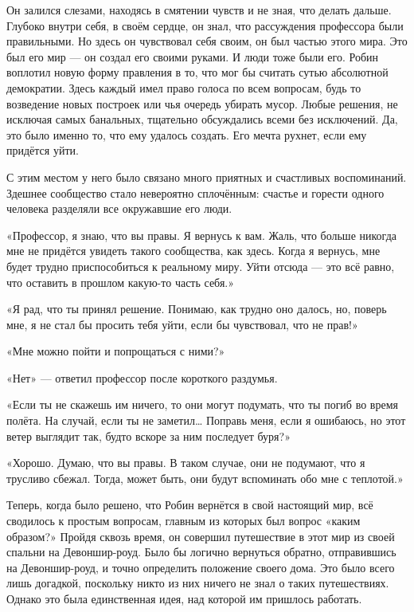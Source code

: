 \documentclass[a5paper, 9pt,
final, openany, twoside=true]{memoir}
\begin{document}
Он залился слезами, находясь в смятении чувств и не зная, что делать дальше. Глубоко внутри себя, в своём сердце, он знал, что рассуждения профессора были правильными. Но здесь он чувствовал себя своим, он был частью этого мира. Это был его мир — он создал его своими руками. И люди тоже были его. Робин воплотил новую форму правления в то, что мог бы считать сутью абсолютной демократии. Здесь каждый имел право голоса по всем вопросам, будь то возведение новых построек или чья очередь убирать мусор. Любые решения, не исключая самых банальных, тщательно обсуждались всеми без исключений. Да, это было именно то, что ему удалось создать. Его мечта рухнет, если ему придётся уйти.

С этим местом у него было связано много приятных и счастливых воспоминаний. Здешнее сообщество стало невероятно сплочённым: счастье и горести одного человека разделяли все окружавшие его люди.

«Профессор, я знаю, что вы правы. Я вернусь к вам. Жаль, что больше никогда мне не придётся увидеть такого сообщества, как здесь. Когда я вернусь, мне будет трудно приспособиться к реальному миру. Уйти отсюда — это всё равно, что оставить в прошлом какую-то часть себя.»

«Я рад, что ты принял решение. Понимаю, как трудно оно далось, но, поверь мне, я не стал бы просить тебя уйти, если бы чувствовал, что не прав!»

«Мне можно пойти и попрощаться с ними?»

«Нет» — ответил профессор после короткого раздумья.

«Если ты не скажешь им ничего, то они могут подумать, что ты погиб во время полёта. На случай, если ты не заметил… Поправь меня, если я ошибаюсь, но этот ветер выглядит так, будто вскоре за ним последует буря?»

«Хорошо. Думаю, что вы правы. В таком случае, они не подумают, что я трусливо сбежал. Тогда, может быть, они будут вспоминать обо мне с теплотой.»\bigskip

Теперь, когда было решено, что Робин вернётся в свой настоящий мир, всё сводилось к простым вопросам, главным из которых был вопрос «каким образом?» Пройдя сквозь время, он совершил путешествие в этот мир из своей спальни на Девоншир-роуд. Было бы логично вернуться обратно, отправившись на Девоншир-роуд, и точно определить положение своего дома. Это было всего лишь догадкой, поскольку никто из них ничего не знал о таких путешествиях. Однако это была единственная идея, над которой им пришлось работать.
\end{document}
